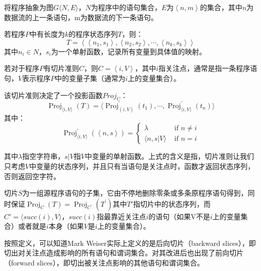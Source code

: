 将程序抽象为图$G\langle N,E\rangle$，$N$为程序中的语句集合，$E$为$\left\langle n,m \right\rangle$的集合，其中$n$为数据流的上一条语句，m为数据流的下一条语句。

\begin{definition}
    
    若程序$P$中有长度为$k$的程序状态序列$T$，则：
    $$T=\left\langle \left\langle n_{1},s_{1} \right\rangle, \left\langle n_{2},s_{2} \right\rangle , \cdots , \left\langle n_{k},s_{k} \right\rangle \right\rangle$$
    其中$n_{i} \in N$，$s_i$为一个单射函数，记录所有变量到具体值的映射。
\end{definition}

\begin{definition}
    
    若对于程序$P$有切片准则$C$，则$C=\left\langle i, V \right\rangle$，其中$i$指关注点，通常是指一条程序语句，$V$表示程序$P$中的变量子集（通常为$i$上的变量集合）。
    
\end{definition}

该切片准则决定了一个投影函数$Proj_C$：
$$
\operatorname{Proj}_{\langle i, V\rangle}(T)=\langle\operatorname{Proj}_{(i, V)}^{\prime}\left(t_{1}\right) , \cdots, \operatorname{Proj}_{\langle i, V\rangle}^{\prime}\left(t_{n}\right) \rangle
$$
其中：
$$
\operatorname{Proj}_{\langle i, V\rangle}^{\prime}(\left\langle n, s \right\rangle)=\begin{cases}
{\lambda} & {\text { if } n \neq i} \\
{\langle n, s | V \rangle} & {\text { if } n=i}
\end{cases}
$$


其中$\lambda$指空字符串，$s|V$指$V$中变量的单射函数。上式的含义是指，切片准则让我们只考虑$V$中变量的状态序列，并且只有当语句是关注点时，函数才返回状态序列，否则返回空字符。

\begin{definition}[程序切片]
    
    切片$S$为一组源程序语句的子集，它由不停地删除零条或多条原程序语句得到，同时保证$\operatorname{Proj}_{C}(T)=\operatorname{Proj}_{C^{\prime}}\left(T^{\prime}\right)$其中$T'$指切片中的状态序列，而$C'=\langle succ(i), V \rangle$，$succ(i)$指最靠近关注点$i$的语句（如果V不是$i$上的变量集合）或者就是$i$本身（如果$ V $是$i$上的变量集合）。
    
\end{definition}

按照定义，可以知道Mark Weiser实际上定义的是后向切片（backward slices），即切出对关注点造成影响的所有语句和谓词集合。对其改进后也出现了前向切片（forward slices），即切出被关注点影响的其他语句和谓词集合。

